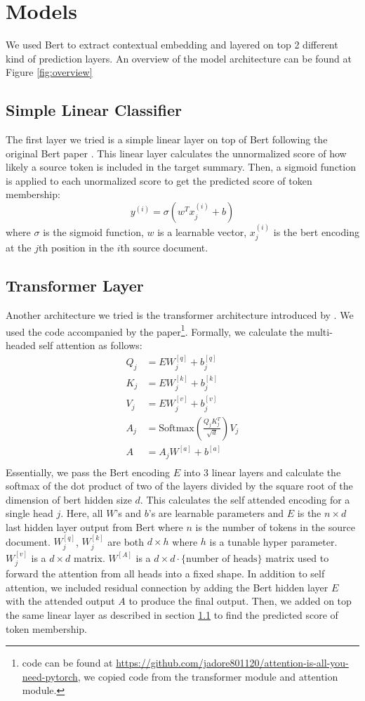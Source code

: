 \documentclass[11pt,a4paper]{article}
\begin{document}
\section{Models}
We used Bert to extract contextual embedding and layered on top 2 different kind of prediction layers. An overview of the model architecture can be found at Figure \ref{fig:overview}

\subsection{Simple Linear Classifier} \label{simple-linear}
The first layer we tried is a simple linear layer on top of Bert following the original Bert paper \cite{bert}. This linear layer calculates the unnormalized score of how likely a source token is included in the target summary. Then, a sigmoid function is applied to each unormalized score to get the predicted score of token membership:
\begin{equation}
	y^{(i)} = \sigma(w^T x_j^{(i)} + b)
\end{equation} 
where $\sigma$ is the sigmoid function, $w$ is a learnable vector, $x_j^{(i)}$ is the bert encoding at the $j$th position in the $i$th source document.

\subsection{Transformer Layer}
Another architecture we tried is the transformer architecture introduced by \citet{attention}. We used the code accompanied by the paper\footnote{code can be found at \url{https://github.com/jadore801120/attention-is-all-you-need-pytorch}, we copied code from the transformer module and attention module.}. Formally, we calculate the multi-headed self attention as follows:
\begin{align}
	Q_j &= EW^{[q]}_j + b^{[q]}_j\\
	K_j &= EW^{[k]}_j + b^{[k]}_j\\
	V_j &= EW^{[v]}_j + b^{[v]}_j\\
	A_j &= \text{Softmax}(\frac{Q_jK_j^T}{\sqrt{d}}) V_j\\
	A &= A_j W^{[a]} + b^{[a]}\\
\end{align}
Essentially, we pass the Bert encoding $E$ into 3 linear layers and calculate the softmax of the dot product of two of the layers divided by the square root of the dimension of bert hidden size $d$. This calculates the self attended encoding for a single head $j$. Here, all $W$'s and $b$'s are learnable parameters and $E$ is the $n\times d$ last hidden layer output from Bert where $n$ is the number of tokens in the source document. $W^{[q]}_j$, $W^{[k]}_j$ are both $d\times h$ where $h$ is a tunable hyper parameter. $W^{[v]}_j$ is a $d\times d$ matrix. $W^{[A]}$ is a $d \times d\cdot\text{\{number of heads\}}$ matrix used to forward the attention from all heads into a fixed shape. In addition to self attention, we included residual connection by adding the Bert hidden layer $E$ with the attended output $A$ to produce the final output. Then, we added on top the same linear layer as described in section \ref{simple-linear} to find the predicted score of token membership.
\end{document}
